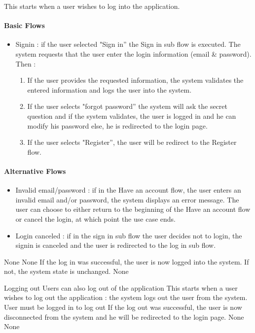 {
  This starts when a user wishes to log into the application.

  \paragraph{Basic Flows}
  \begin{itemize}
    \item Signin : if the user selected "Sign in” the Sign in sub flow is executed. The system requests that the user enter the login information (email \& password). Then :
    \begin{enumerate}
      \item If the user provides the requested information, the system validates the entered information and logs the user into the system.
      \item If the user selects "forgot password”  the system will ask the secret question and if the system validates, the user is logged in and he can modify his password else, he is redirected to the login page.
      \item If the user selects "Register”, the user will be redirect to the Register flow.
    \end{enumerate}
  \end{itemize}

  \paragraph{Alternative Flows}
  \begin{itemize}
    \item Invalid email/password : if in the Have an account flow, the user enters an invalid email and/or password, the system displays an error message. The user can choose to either return to the beginning of the Have an account flow or cancel the login, at which point the use case ends.
    \item Login canceled : if in the sign in sub flow the user decides not to login, the signin is canceled and the user is redirected to the log in sub flow.
  \end{itemize}
}
{None}
{None}
{If the log in was successful, the user is now logged into the system.  If not, the system state is unchanged.}
{None}

\subusecasedesc
{Logging out}
{Users can also log out of the application}
{
  This starts when a user wishes to log out the application : the system logs out the user from the system.
}
{User must be logged in to log out}
{
  If the log out was successful, the user is now disconnected from the system and he will be redirected to the login page.
}
{None}
{None}

